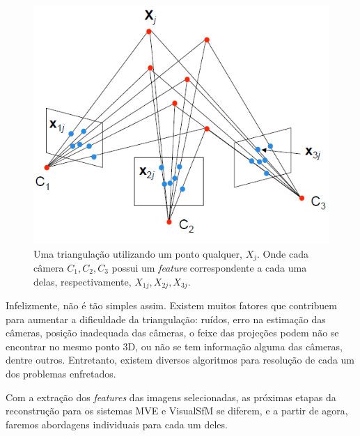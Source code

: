 \begin{figure} [!h]
	\centering
	\includegraphics[width=0.45\linewidth]{figs/triangulacao.png}
	\caption{%
	Uma triangulação utilizando um ponto qualquer, $X_j$. Onde cada câmera $C_1, C_2, C_3$ possui um \emph{feature} correspondente a cada uma delas, respectivamente, $X_{1j}, X_{2j}, X_{3j}$.
	}\label{fig:triangulacao}
\end{figure}

Infelizmente, não é tão simples assim. Existem muitos fatores que contribuem
para aumentar a dificuldade da triangulação: ruídos, erro na estimação das
câmeras, posição inadequada das câmeras, o
feixe das projeções podem não se encontrar no mesmo ponto 3D, ou não se tem
informação alguma das câmeras, dentre outros. Entretanto, existem diversos algoritmos
para resolução de cada um dos problemas enfretados. 

Com a extração dos \emph{features} das imagens selecionadas, as próximas etapas
da reconstrução para os sistemas MVE e VisualSfM se diferem, e a partir de
agora, faremos abordagens individuais para cada um deles.




